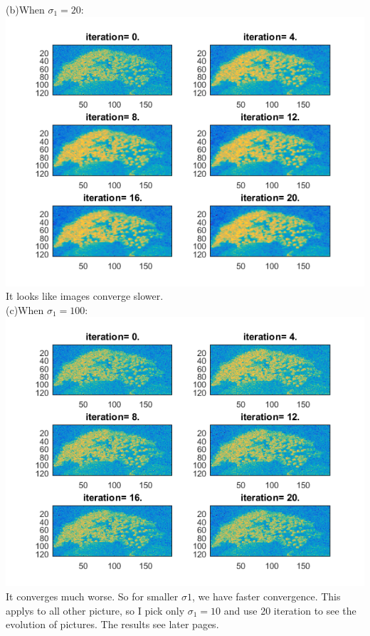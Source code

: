 \documentclass[11pt]{scrartcl}
\begin{document}
(b)When $\sigma_1=20$:\\
\includegraphics[scale=1]{D1_20_20.png}\\
It looks like images converge slower.\\
(c)When $\sigma_1=100$:\\
\includegraphics[scale=1]{D1_100_20.png}\\
It converges much worse. So for smaller $\sigma1$, we have faster convergence. This applys to all other picture, so I pick only $\sigma_1=10$ and use 20 iteration to see the evolution of pictures. The results see later pages.\\
\end{document}
